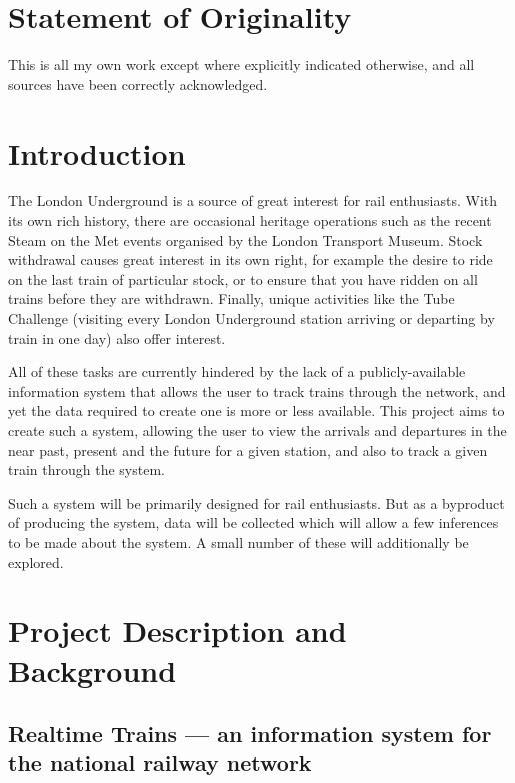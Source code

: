 \documentclass[a4paper,12pt]{article}
\begin{document}
\tableofcontents

\pagebreak

\section*{Statement of Originality}

This is all my own work except where explicitly indicated otherwise, and all
sources have been correctly acknowledged.

\pagebreak

\section{Introduction}

The London Underground is a source of great interest for rail enthusiasts. With
its own rich history, there are occasional heritage operations such as the
recent Steam on the Met events organised by the London Transport Museum. Stock
withdrawal causes great interest in its own right, for example the desire to
ride on the last train of particular stock, or to ensure that you have ridden
on all trains before they are withdrawn. Finally, unique activities like the
Tube Challenge (visiting every London Underground station arriving or departing
by train in one day) also offer interest.

All of these tasks are currently hindered by the lack of a publicly-available
information system that allows the user to track trains through the network,
and yet the data required to create one is more or less available. This project
aims to create such a system, allowing the user to view the arrivals and
departures in the near past, present and the future for a given station, and
also to track a given train through the system.

Such a system will be primarily designed for rail enthusiasts. But as a
byproduct of producing the system, data will be collected which will allow a
few inferences to be made about the system. A small number of these will
additionally be explored.

\section{Project Description and Background}

\subsection{Realtime Trains --- an information system for the national railway
network}
\end{document}
